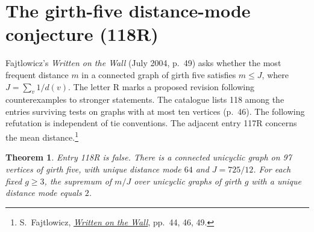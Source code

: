 \documentclass[11pt,a4paper]{article}
\newtheorem{theorem}{Theorem}[section]
\theoremstyle{remark}\newtheorem*{remark}{Remark}
\begin{document}
\section{The girth-five distance-mode conjecture (118R)}\label{sec:118mode}
Fajtlowicz's \emph{Written on the Wall} (July 2004, p.~49) asks whether the most frequent distance $m$ in a connected graph of girth five satisfies $m\le J$, where $J=\sum_v1/d(v)$. The letter R marks a proposed revision following counterexamples to stronger statements. The catalogue lists 118 among the entries surviving tests on graphs with at most ten vertices (p.~46). The following refutation is independent of tie conventions. The adjacent entry 117R concerns the mean distance.\footnote{S.~Fajtlowicz, \href{https://independencenumber.wordpress.com/wp-content/uploads/2012/08/wow-july2004.pdf}{\emph{Written on the Wall}}, pp.~44, 46, 49.}
\begin{theorem}\label{thm:118}
Entry 118R is false. There is a connected unicyclic graph on 97 vertices of girth five, with unique distance mode $64$ and $J=725/12$. For each fixed $g\ge3$, the supremum of $m/J$ over unicyclic graphs of girth $g$ with a unique distance mode equals $2$.
\end{theorem}
\end{document}
